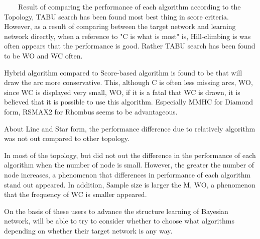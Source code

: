 ~~~~Result of comparing the performance of each algorithm according to the Topology, TABU search has been found most best thing in score criteria. However, as a result of comparing between the target network and learning network directly, when a reference to "C is what is most" is, Hill-climbing is was often appears that the performance is good. Rather TABU search has been found to be WO and WC often.

Hybrid algorithm compared to Score-based algorithm is found to be that will draw the arc more conservative. This, although C is often less missing arcs, WO, since WC is displayed very small, WO, if it is a fatal that WC is drawn, it is believed that it is possible to use this algorithm. Especially MMHC for Diamond form, RSMAX2 for Rhombus seems to be advantageous.

About Line and Star form, the performance difference due to relatively algorithm was not out compared to other topology.

In most of the topology, but did not out the difference in the performance of each algorithm when the number of node is small. However, the greater the number of node increases, a phenomenon that differences in performance of each algorithm stand out appeared. In addition, Sample size is larger the M, WO, a phenomenon that the frequency of WC is smaller appeared.

On the basis of these users to advance the structure learning of Bayesian network, will be able to try to consider whether to choose what algorithms depending on whether their target network is any way.

